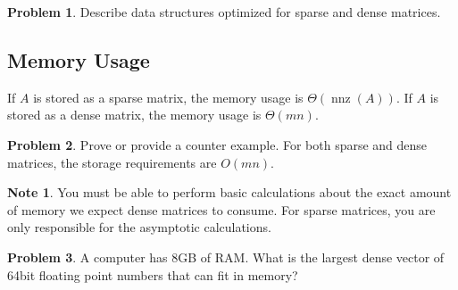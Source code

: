 \documentclass[10pt]{article}
\theoremstyle{definition}
\newtheorem{problem}{Problem}
\newtheorem{note}{Note}
\DeclareMathOperator{\nnz}{nnz}
\begin{document}
\begin{problem}
    Describe data structures optimized for sparse and dense matrices.
\end{problem}

\newpage
\subsection{Memory Usage}

If $A$ is stored as a sparse matrix,
the memory usage is $\Theta(\nnz(A))$.
If $A$ is stored as a dense matrix,
the memory usage is $\Theta(mn)$.

\begin{problem}
    Prove or provide a counter example.
    For both sparse and dense matrices,
    the storage requirements are $O(mn)$.
    \vspace{4in}
\end{problem}

\newpage
\begin{note}
    You must be able to perform basic calculations about the exact amount of memory we expect dense matrices to consume.
    For sparse matrices, you are only responsible for the asymptotic calculations.
\end{note}
\begin{problem}
    A computer has 8GB of RAM.
    What is the largest dense vector of 64bit floating point numbers that can fit in memory?
    \vspace{4in}
\end{problem}
\end{document}
